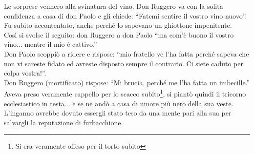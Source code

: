 Le sorprese vennero alla svinatura del vino. Don Ruggero va con la solita confidenza a casa di don Paolo e gli chiede: “Fatemi sentire il vostro vino nuovo”. Fu subito accontentato, anche perché lo sapevano un ghiottone impenitente. \\
Così si svolse il seguito: don Ruggero a don Paolo “ma com’è buono il vostro vino... mentre il mio è cattivo.” \\
Don Paolo scoppiò a ridere e rispose: “mio fratello ve l’ha fatta perché sapeva che non vi sareste fidato ed avreste disposto sempre il contrario. Ci siete caduto per colpa vostra!”.\\
Don Ruggero (mortificato) rispose: “Mi brucia, perché me l’ha fatta un imbecille.”\\
Aveva preso veramente cappello per lo scacco subito\footnote{Si era veramente offeso per il torto subito}, si piantò quindi il tricorno ecclesiastico in testa... e se ne andò a casa di umore più nero della sua veste.\\
L’inganno avrebbe dovuto essergli stato teso da una mente pari alla sua per salvargli la reputazione di furbacchione.\\